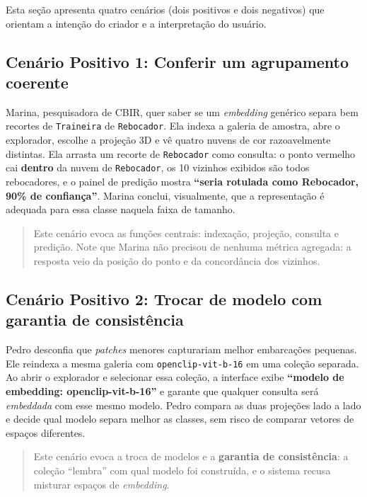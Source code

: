 \documentclass[10pt]{article}
\begin{document}
Esta seção apresenta quatro cenários (dois positivos e dois negativos) que
orientam a intenção do criador e a interpretação do usuário.

\subsection{Cenário Positivo 1: Conferir um agrupamento coerente}

Marina, pesquisadora de CBIR, quer saber se um \emph{embedding} genérico separa
bem recortes de \texttt{Traineira} de \texttt{Rebocador}. Ela indexa a galeria
de amostra, abre o explorador, escolhe a projeção 3D e vê quatro nuvens de cor
razoavelmente distintas. Ela arrasta um recorte de \texttt{Rebocador} como
consulta: o ponto vermelho cai \textbf{dentro} da nuvem de \texttt{Rebocador},
os 10 vizinhos exibidos são todos rebocadores, e o painel de predição mostra
\textbf{``seria rotulada como Rebocador, 90\% de confiança''}. Marina conclui,
visualmente, que a representação é adequada para essa classe naquela faixa de
tamanho.

\begin{quote}\small
Este cenário evoca as funções centrais: indexação, projeção, consulta e
predição. Note que Marina não precisou de nenhuma métrica agregada: a resposta
veio da posição do ponto e da concordância dos vizinhos.
\end{quote}

\subsection{Cenário Positivo 2: Trocar de modelo com garantia de consistência}

Pedro desconfia que \emph{patches} menores capturariam melhor embarcações
pequenas. Ele reindexa a mesma galeria com \texttt{openclip-vit-b-16} em uma
coleção separada. Ao abrir o explorador e selecionar essa coleção, a interface
exibe \textbf{``modelo de embedding: openclip-vit-b-16''} e garante que qualquer
consulta será \emph{embeddada} com esse mesmo modelo. Pedro compara as duas
projeções lado a lado e decide qual modelo separa melhor as classes, sem risco
de comparar vetores de espaços diferentes.

\begin{quote}\small
Este cenário evoca a troca de modelos e a \textbf{garantia de consistência}: a
coleção ``lembra'' com qual modelo foi construída, e o sistema recusa misturar
espaços de \emph{embedding}.
\end{quote}
\end{document}
